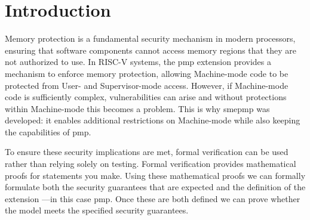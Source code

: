\glsresetall

\chapter{Introduction}\label{cha:intro}
Memory protection is a fundamental security mechanism in modern processors, ensuring that software components cannot access memory regions that they are not authorized to use.
In RISC-V systems, the \gls{pmp} extension provides a mechanism to enforce memory protection, allowing Machine-mode code to be protected from User- and Supervisor-mode access.
However, if Machine-mode code is sufficiently complex, vulnerabilities can arise and without protections within Machine-mode this becomes a problem.
This is why \gls{smepmp} was developed: it enables additional restrictions on Machine-mode while also keeping the capabilities of \gls{pmp}. 

To ensure these security implications are met, formal verification can be used rather than relying solely on testing.
Formal verification provides mathematical proofs for statements you make.
Using these mathematical proofs we can formally formulate both the security guarantees that are expected and the definition of the extension ---in this case \gls{pmp}.
Once these are both defined we can prove whether the model meets the specified security guarantees.

